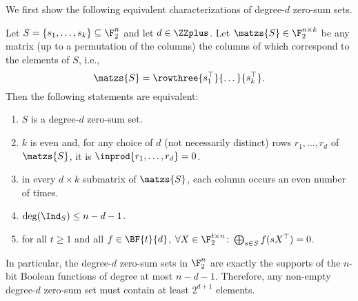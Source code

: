 We first show the following equivalent characterizations of degree-$d$ zero-sum sets. 
\begin{proposition}
Let $S = \{s_1,\dots,s_{k}\} \subseteq \F_2^n$ and let $d \in \ZZplus$. Let $\matzs{S} \in \F_2^{n \times k}$ be any matrix (up to a permutation of the columns) the columns of which correspond to the elements of $S$, i.e., $$
\matzs{S} = \rowthree{s_1^\top}{\dots}{s_{k}^\top}.
$$
Then the following statements are equivalent: 
\enumroman
\begin{enumerate}
    \item $S$ is a degree-$d$ zero-sum set.
    \item $k$ is even and, for any choice of $d$ (not necessarily distinct) rows $r_1,\dots,r_d$ of $\matzs{S}$, it is $\inprod{ r_1,\dots,r_d} = 0$.
    \item in every $d \times k$ submatrix of $\matzs{S}$, each column occurs an even number of times.
    \item $\deg(\Ind_S) \leq n-d-1$.
    \item for all $t \geq 1$ and all $f \in \BF{t}{d}$, $\forall X \in \F_2^{t \times n}\colon \bigoplus_{s \in S} f(sX^\top) = 0$.
\end{enumerate}
In particular, the degree-$d$ zero-sum sets in $\F_2^n$ are exactly the supports of the $n$-bit Boolean functions of degree at most $n-d-1$. Therefore, any non-empty degree-$d$ zero-sum set must contain at least $2^{d+1}$ elements.
\end{proposition}
